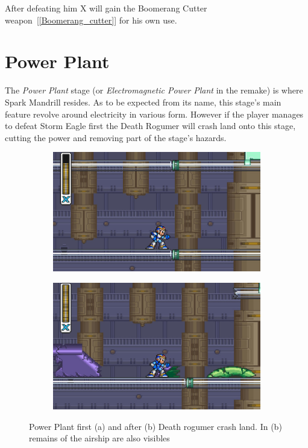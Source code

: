 After defeating him X will gain the Boomerang Cutter weapon~[\ref{Boomerang_cutter}] for his own use.

\section{Power Plant}
The \textit{Power Plant} stage (or \textit{Electromagnetic Power Plant} in the remake) is where Spark Mandrill resides. As to be expected from its name, this stage's main feature revolve around electricity in various form. However if the player manages to defeat Storm Eagle first the Death Rogumer will crash land onto this stage, cutting the power and removing part of the stage's hazards.
\begin{figure}[htp]
	\centering
\begin{subfigure}{0.42\linewidth}
	\centering
	\includegraphics[width=\linewidth]{figures/X1/Spark_mandrill/Mandrill_power.jpg}
	\caption{}
\end{subfigure}
\begin{subfigure}{0.4\linewidth}
	\centering
	\includegraphics[width=\linewidth]{figures/X1/Spark_mandrill/Mandrill_no_power.jpg}
	\caption{}
\end{subfigure}
\caption{Power Plant first (a) and after (b) Death rogumer crash land. In (b) remains of the airship are also visibles}
\end{figure}

